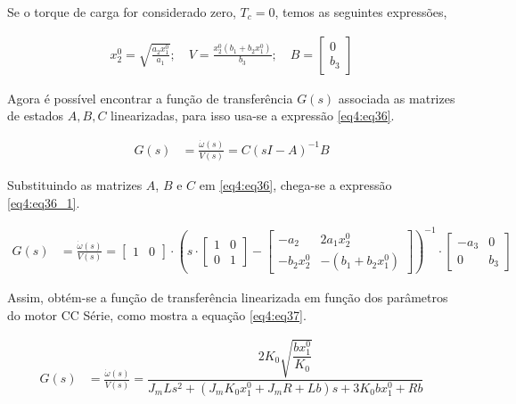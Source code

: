 Se o torque de carga for considerado zero, $T_c = 0$, temos as seguintes expressões,

\begin{align}
     x_2^0 = \sqrt{\frac{a_2x_1^0}{a_1}}; \quad
         V = \frac{x_2^0(b_1+b_2x_1^0)}{b_3}; \quad
         B = \begin{bmatrix}
        0\\
        b_3
\end{bmatrix}  \label{eq4:eq35}
\end{align}

Agora é possível encontrar a função de transferência $G(s)$ associada as matrizes de estados $A, B, C$ linearizadas, para isso usa-se a expressão \ref{eq4:eq36}.


\begin{align}
    G(s) &= \frac{\dot{\omega}(s)}{V(s)} = C(sI-A)^{-1}B     \label{eq4:eq36}
\end{align}

Substituindo as matrizes $A$, $B$ e $C$ em \ref{eq4:eq36}, chega-se a expressão \ref{eq4:eq36_1}.

\begin{align}
    G(s) &= \frac{\dot{\omega}(s)}{V(s)} = \begin{bmatrix}
        1 & 0
\end{bmatrix} \cdot \left(s \cdot \begin{bmatrix}
    1  & 0\\
    0  & 1
\end{bmatrix}-\begin{bmatrix}
    -a_2       &   2a_1x_2^0\\
    -b_2x_2^0  & -(b_1+b_2x_1^0)
\end{bmatrix}\right)^{-1} \cdot \begin{bmatrix}
    -a_3       &   0\\
    0  & b_3
\end{bmatrix}     \label{eq4:eq36_1}
\end{align}

Assim, obtém-se a função de transferência linearizada em função dos parâmetros do motor CC Série, como mostra a equação \ref{eq4:eq37}.



\begin{align}
    G(s) &= \frac{\dot{\omega}(s)}{V(s)} = \dfrac{2 K_{0} \sqrt{\dfrac{b x^{0}_{1}}{K_{0}}}}{J_m L s^{2} + \left(J_m K_{0} x^{0}_{1} + J_m R + L b\right)s  + 3 K_{0} b x^{0}_{1} + R b }     \label{eq4:eq37}
\end{align}

